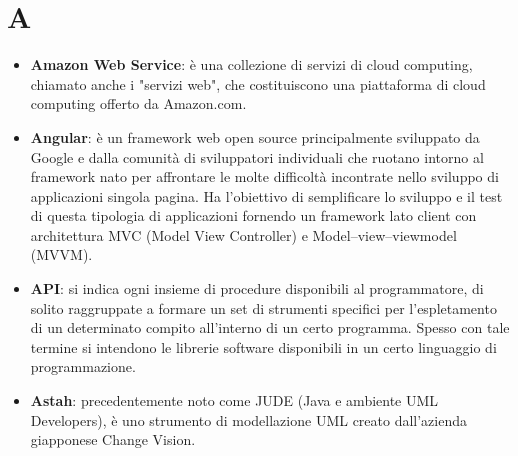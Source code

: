 \section{A}
\begin{itemize}
	\item
	\textbf{Amazon Web Service}: è una collezione di servizi di cloud computing, chiamato anche i "servizi web", che costituiscono una piattaforma di cloud computing offerto da Amazon.com.
	\item
	\textbf{Angular}: è un framework web open source principalmente sviluppato da Google e dalla comunità di sviluppatori individuali che ruotano intorno al framework nato per affrontare le molte difficoltà incontrate nello sviluppo di applicazioni singola pagina. Ha l'obiettivo di semplificare lo sviluppo e il test di questa tipologia di applicazioni fornendo un framework lato client con architettura MVC (Model View Controller) e Model–view–viewmodel (MVVM).
	\item
	\textbf{API}: si indica ogni insieme di procedure disponibili al programmatore, di solito raggruppate a formare un set di strumenti specifici per l'espletamento di un determinato compito all'interno di un certo programma. Spesso con tale termine si intendono le librerie software disponibili in un certo linguaggio di programmazione.
	\item 
	\textbf{Astah}: precedentemente noto come JUDE (Java e ambiente UML Developers), è uno strumento di modellazione UML creato dall'azienda giapponese Change Vision.
\end{itemize}